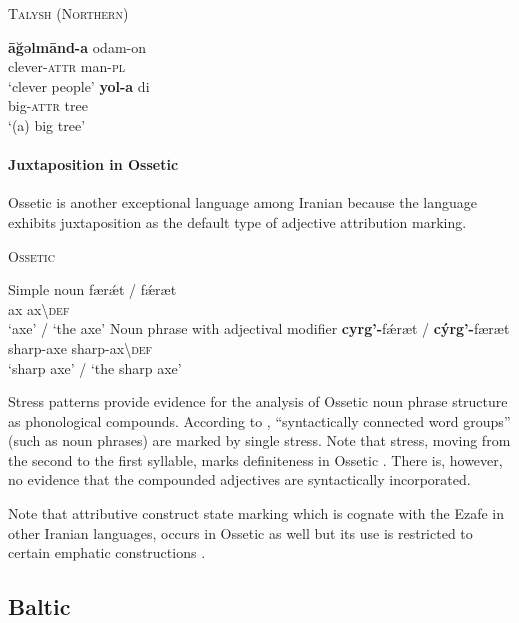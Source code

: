 \begin{exe}
\ex \textsc{Talysh (Northern)} \cite[27]{schulze2000}%
\begin{xlist}
\ex
\gll	\textbf{āğəlmānd-a} odam-on\\
	clever-\textsc{attr} man-\textsc{pl}\\
\glt	‘clever people’
\ex
\gll	\textbf{yol-a} di\\
	big-\textsc{attr} tree\\
\glt	‘(a) big tree’
\end{xlist}
\end{exe}

\paragraph{Juxtaposition in Ossetic}
Ossetic is another exceptional language among Iranian because the language exhibits juxtaposition as the default type of adjective attribution marking.
\begin{exe}
\ex \textsc{Ossetic} \cite[12]{abaev1964} \label{ossetic attrcomp}
\begin{xlist}
\ex	Simple noun
\gll	færǽt / fǽræt\\
	ax { } ax\textbackslash\textsc{def}\\
\glt	‘axe’ / ‘the axe’
\ex	Noun phrase with adjectival modifier
\gll	\textbf{cyrg'-}fǽræt / \textbf{cýrg'-}færæt\\
	sharp-axe { } sharp-ax\textbackslash\textsc{def}\\
\glt	‘sharp axe’ / ‘the sharp axe’
\end{xlist}
\end{exe}
Stress patterns provide evidence for the analysis of Ossetic noun phrase structure as phonological compounds. According to \citet[10]{abaev1964}, “syntactically connected word groups” (such as noun phrases) are marked by single stress. Note that stress, moving from the second to the first syllable, marks definiteness in Ossetic \citep[12]{abaev1964}. There is, however, no evidence that the compounded adjectives are syntactically incorporated.

Note that attributive construct state marking which is cognate with the Ezafe in other Iranian languages, occurs in Ossetic as well but its use is restricted to certain emphatic constructions \cite[467]{thodarson1989}.

\subsection{Baltic} \label{baltic synchr}
